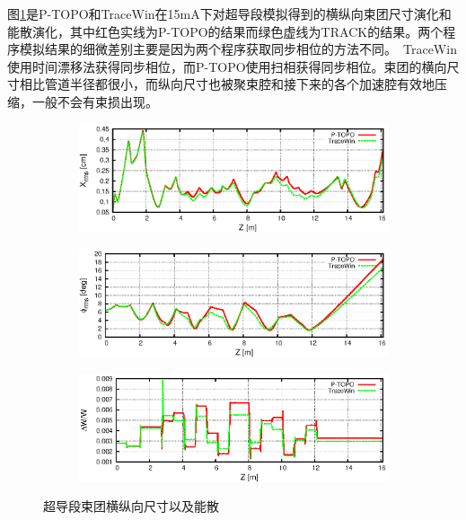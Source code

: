 图\ref{fig:ADS_SC_size}是P-TOPO和TraceWin在15mA下对超导段模拟得到的横纵向束团尺寸演化和能散演化，其中红色实线为P-TOPO的结果而绿色虚线为TRACK的结果。两个程序模拟结果的细微差别主要是因为两个程序获取同步相位的方法不同。~TraceWin使用时间漂移法获得同步相位，而P-TOPO使用扫相获得同步相位。束团的横向尺寸相比管道半径都很小，而纵向尺寸也被聚束腔和接下来的各个加速腔有效地压缩，一般不会有束损出现。
\begin{figure}[!htb]
    \centering
    \begin{subfigure}[b]{0.9\textwidth}
        \includegraphics[width=\textwidth]{Img/ADS_SC_size1.eps}
    \end{subfigure}
    \begin{subfigure}[b]{0.9\textwidth}
        \includegraphics[width=\textwidth]{Img/ADS_SC_size2.eps}
    \end{subfigure}
    \begin{subfigure}[b]{0.9\textwidth}
        \includegraphics[width=\textwidth]{Img/ADS_SC_size3.eps}
    \end{subfigure}
    \caption{超导段束团横纵向尺寸以及能散}\label{fig:ADS_SC_size}
\end{figure}

